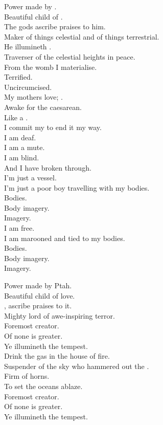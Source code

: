 Power made by . \\
Beautiful child of . \\
The gods ascribe praises to him. \\
Maker of things celestial and of things terrestrial. \\
He illumineth . \\
Traverser of the celestial heights in peace. \\

From the womb I materialise. \\
Terrified. \\
Uncircumcised. \\
My mothers love; . \\
Awake for the caesarean. \\
Like a . \\
I commit my  to end it my way. \\
I am deaf. \\
I am a mute. \\
I am blind. \\
And I have broken through. \\

I'm just a vessel. \\
I'm just a poor boy travelling with my bodies. \\
Bodies. \\
Body imagery. \\
Imagery. \\
I am free. \\
I am marooned and tied to my bodies. \\
Bodies. \\
Body imagery. \\
Imagery. \\


Power made by Ptah. \\
Beautiful child of love. \\
, ascribe praises to it. \\
Mighty lord of awe-inspiring terror. \\
Foremost creator. \\
Of none is greater. \\
Ye illumineth the tempest. \\

Drink the gas in the house of fire. \\
Suspender of the sky who hammered out the . \\
Firm of horns. \\
To set the oceans ablaze. \\
Foremost creator. \\
Of none is greater. \\
Ye illumineth the tempest. \\

